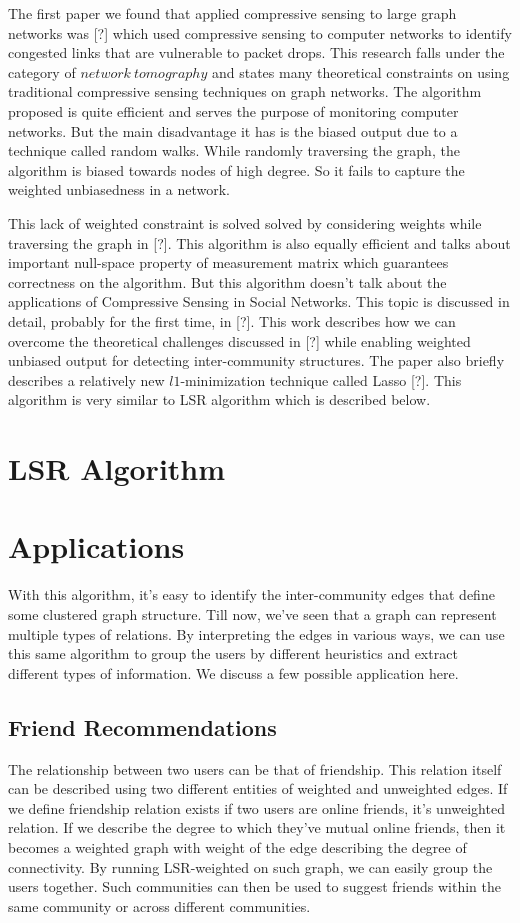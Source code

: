 \documentclass{article}
\begin{document}
The first paper we found that applied compressive sensing to large graph networks was [?] which used compressive sensing
to computer networks to identify congested links that are vulnerable to packet drops. This research falls under the
category of $network\ tomography$ and states many theoretical constraints on using traditional compressive sensing
techniques on graph networks. The algorithm proposed is quite efficient and serves the purpose of monitoring computer
networks. But the main disadvantage it has is the biased output due to a technique called random walks. While randomly
traversing the graph, the algorithm is biased towards nodes of high degree. So it fails to capture the weighted
unbiasedness in a network.

This lack of weighted constraint is solved solved by considering weights while traversing the graph in [?]. This
algorithm is also equally efficient and talks about important null-space property of measurement matrix which guarantees
correctness on the algorithm. But this algorithm doesn't talk about the applications of Compressive Sensing in Social
Networks. This topic is discussed in detail, probably for the first time, in [?]. This work describes how we can
overcome the theoretical challenges discussed in [?] while enabling weighted unbiased output for detecting
inter-community structures. The paper also briefly describes a relatively new $l1$-minimization technique called Lasso
[?]. This algorithm is very similar to LSR algorithm which is described below.  
\section{LSR Algorithm}

\section{Applications}
With this algorithm, it's easy to identify the inter-community edges that define some clustered graph structure. Till
now, we've seen that a graph can represent multiple types of relations. By interpreting the edges in various ways, we
can use this same algorithm to group the users by different heuristics and extract different types of information. We
discuss a few possible application here.
\subsection{Friend Recommendations}
The relationship between two users can be that of friendship. This relation itself can be described using two different
entities of weighted and unweighted edges. If we define friendship relation exists if two users are online friends, it's
unweighted relation. If we describe the degree to which they've mutual online friends, then it becomes a weighted graph
with weight of the edge describing the degree of connectivity. By running LSR-weighted on such graph, we can easily
group the users together. Such communities can then be used to suggest friends within the same community or across
different communities. 
\end{document}
